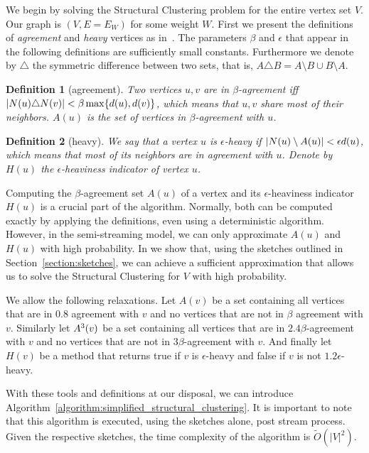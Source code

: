 \documentclass{article}
\newtheorem{definition}{Definition}[section]
\begin{document}
We begin by solving the Structural Clustering problem for the entire vertex set $V$.
Our graph is $(V,E=E_W)$ for some weight $W$. First we present the definitions of \textit{agreement} and \textit{heavy} vertices as in~\cite{cohen2021correlation}. 
The parameters $\beta$ and $\epsilon$ that appear in the following definitions are sufficiently small constants. Furthermore we denote by $\triangle$ the symmetric difference between two sets, that is, $A \triangle B = A \setminus B \cup B \setminus A$.

\begin{definition}[agreement]
\label{definition:agreement}
Two vertices $u, v$ are in $\beta$-agreement iff $\left|N(u)\triangle N(v)\right| < \beta \max\{d(u), d(v)\}$, which means that $u, v$ share most of their neighbors. $A(u)$ is the set of vertices in $\beta$-agreement with $u$.
\end{definition}

\begin{definition}[heavy]
\label{definition:heavy}
We say that a vertex $u$ is $\epsilon$-heavy if $\left|N(u) \setminus A(u)\right| < \epsilon d(u)$, which means that most of its neighbors are in agreement with $u$. Denote by $H(u)$ the $\epsilon$-heaviness indicator of vertex $u$.
\end{definition}

Computing the $\beta$-agreement set $A(u)$ of a vertex and its $\epsilon$-heaviness indicator $H(u)$ is a crucial part of the algorithm. Normally, both can be computed exactly by applying the definitions, even using a deterministic algorithm. However, in the semi-streaming model, we can only approximate $A(u)$ and $H(u)$ with high probability. 
In  we show that, using the sketches outlined in Section~\ref{section:sketches}, we can achieve a sufficient approximation that allows us to solve the Structural Clustering for $V$ with high probability.

We allow the following relaxations. Let $A(v)$ be a set containing all vertices that are in $0.8$ agreement with $v$ and no vertices that are not in $\beta$ agreement with $v$. Similarly let $A^3(v)$ be a set containing all vertices that are in $2.4\beta$-agreement with $v$ and no vertices that are not in $3\beta$-agreement with $v$. And finally let $H(v)$ be a method that returns true if $v$ is $\epsilon$-heavy and false if $v$ is not $1.2\epsilon$-heavy.

With these tools and definitions at our disposal, we can introduce Algorithm~\ref{algorithm:simplified_structural_clustering}. It is important to note that this algorithm is executed, using the sketches alone, post stream process. Given the respective sketches, the time complexity of the algorithm is $\widetilde{O}(|V|^2)$.
\end{document}
